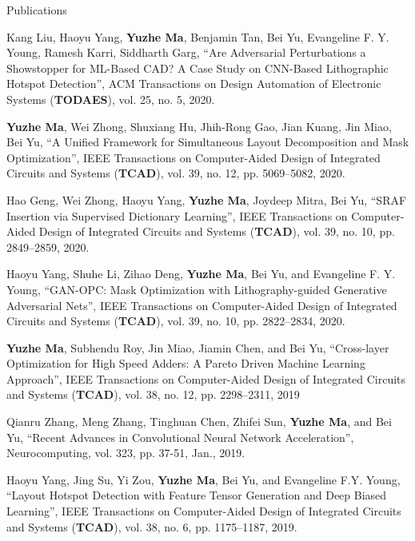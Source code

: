 \begin{rSection}{Publications}
\begin{etaremune}
\item{
        Kang Liu, Haoyu Yang, \textbf{Yuzhe Ma}, Benjamin Tan, Bei Yu, Evangeline F. Y. Young, Ramesh Karri, Siddharth Garg,
        ``Are Adversarial Perturbations a Showstopper for ML-Based CAD? A Case Study on CNN-Based Lithographic Hotspot Detection'',
        ACM Transactions on Design Automation of Electronic Systems (\textbf{TODAES}), vol. 25, no. 5, 2020.
}


\item{
        \textbf{Yuzhe Ma}, Wei Zhong, Shuxiang Hu, Jhih-Rong Gao, Jian Kuang, Jin Miao, Bei Yu,
        ``A Unified Framework for Simultaneous Layout Decomposition and Mask Optimization'',
        IEEE Transactions on Computer-Aided Design of Integrated Circuits and Systems (\textbf{TCAD}), vol. 39, no. 12, pp. 5069--5082, 2020.
}

\item{
     Hao Geng, Wei Zhong, Haoyu Yang, \textbf{Yuzhe Ma}, Joydeep Mitra, Bei Yu,
        ``SRAF Insertion via Supervised Dictionary Learning'',
        IEEE Transactions on Computer-Aided Design of Integrated Circuits and Systems (\textbf{TCAD}), vol. 39, no. 10, pp. 2849--2859, 2020.
}

\item{
    Haoyu Yang, Shuhe Li, Zihao Deng, \textbf{Yuzhe Ma}, Bei Yu, and Evangeline F. Y. Young,
    ``GAN-OPC: Mask Optimization with Lithography-guided Generative Adversarial Nets'',
     IEEE Transactions on Computer-Aided Design of Integrated Circuits and Systems (\textbf{TCAD}), vol. 39, no. 10, pp. 2822--2834, 2020.
}

\item{
	\textbf{Yuzhe Ma}, Subhendu Roy, Jin Miao, Jiamin Chen, and Bei Yu,
	``Cross-layer Optimization for High Speed Adders: A Pareto Driven Machine Learning Approach'',
    IEEE Transactions on Computer-Aided Design of Integrated Circuits and Systems (\textbf{TCAD}), vol. 38, no. 12, pp. 2298--2311, 2019
}

\item{
	Qianru Zhang, Meng Zhang, Tinghuan Chen, Zhifei Sun, \textbf{Yuzhe Ma}, and Bei Yu,
	``Recent Advances in Convolutional Neural Network Acceleration'',
	Neurocomputing, vol. 323, pp. 37-51, Jan., 2019.
}

\item{
	Haoyu Yang, Jing Su, Yi Zou, \textbf{Yuzhe Ma}, Bei Yu, and Evangeline F.Y. Young,
	``Layout Hotspot Detection with Feature Tensor Generation and Deep Biased Learning'',
	IEEE Transactions on Computer-Aided Design of Integrated Circuits and Systems (\textbf{TCAD}), vol. 38, no. 6, pp. 1175--1187, 2019.
}


\end{etaremune}
\end{rSection}
